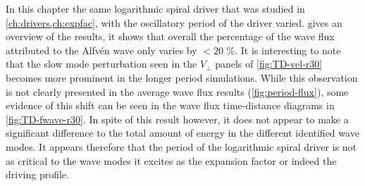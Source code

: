 In this chapter the same logarithmic spiral driver that was studied in \cref{ch:drivers,ch:expfac}, with the oscillatory period of the driver varied.
 gives an overview of the results, it shows that overall the percentage of the wave flux attributed to the Alfv\'en wave only varies by $<20$ \%.
It is interesting to note that the slow mode perturbation seen in the $V_\perp$ panels of \cref{fig:TD-vel-r30} becomes more prominent in the longer period simulations.
While this observation is not clearly presented in the average wave flux results (\cref{fig:period-flux}), some evidence of this shift can be seen in the wave flux time-distance diagrams in \cref{fig:TD-fwave-r30}.
In spite of this result however, it does not appear to make a significant difference to the total amount of energy in the different identified wave modes.
It appears therefore that the period of the logarithmic spiral driver is not as critical to the wave modes it excites as the expansion factor or indeed the driving profile.



